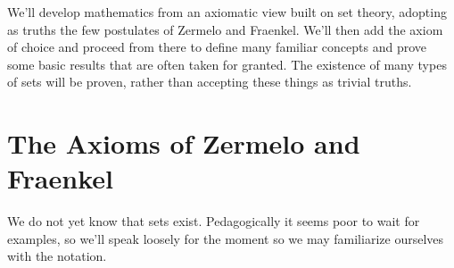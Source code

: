 We'll develop mathematics from an axiomatic view built on set theory, adopting
as truths the few postulates of Zermelo and Fraenkel. We'll then add the axiom
of choice and proceed from there to define many familiar concepts and prove some
basic results that are often taken for granted. The existence of many types of
sets will be proven, rather than accepting these things as trivial truths.
\section{The Axioms of Zermelo and Fraenkel}
    We do not yet know that sets exist. Pedagogically it seems poor to wait
    for examples, so we'll speak loosely for the moment so we may familiarize
    ourselves with the notation.
    \newpage

